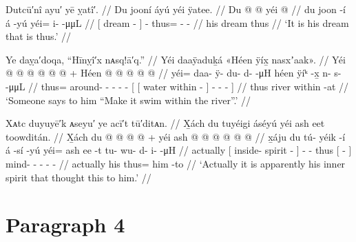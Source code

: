 \ex\label{ex:91-31-dream-thus}%
%
\begingl
	\glpreamble	Dutcū′nî ayu′ yē ỵatî′. //
	\glpreamble	Du jooní áyú yéi ÿatee. //
	\gla	{} Du  @ {} {}  @ {}
		yéi @  {} {} //
	\glb	{} du joon -í {} á -yú
		yéi= i-  -μμL //
	\glc	{}[  dream - {}]  -
		thus= -  - //
	\gld	{} his dream {} {}  {}
		thus  {} {} //
	\glft	‘It is his dream that is thus.’
		//
\endgl
\xe

\ex\label{ex:91-32-say-make-swim-in-river}%
%
\begingl
	\glpreamble	Ye daỵa′doqa, “Hīnỵî′x nᴀsq!ā′q.” //
	\glpreamble	Yéi daaÿaduḵá «\!Héen ÿíx̱ nasxʼaak\!». //
	\gla	Yéi @  @ {} @ {} @ {} @ {} @ {} +
		{} {} Héen  @ {} {}
			 @ {} @ {} @ {} @ {} {} //
	\glb	yéi= daa- ÿ- du- d-  -μH
		{} {} héen ÿíᵏ -x̱ {}
			n- {} s-  -μμL {} //
	\glc	thus= around- - - -  -
		{}[ {}[ water within - {}]
			- \· -  - {}] //
	\gld	thus  {} {} {} {} {}
		{} {} river within -at {}
			 {} {} {} {} {} {} //
	\glft	‘Someone says to him “Make it swim within the river”.’
		//
\endgl
\xe

\ex\label{ex:91-33-inner-spirit-thought-to-him}%
%
\begingl
	\glpreamble	Xᴀtc duyuyē′k ᴀseyu′ ye acī′t tū′ditᴀn. //
	\glpreamble	X̱ách du tuyéigi áséyú yéi ash eet toowditán. //
	\gla	X̱ách {} du  @ {} @ {} {}  @ {} @ {} +
		yéi {} ash  @ {} {}  @ {} @ {} @ {} @ {} @ {} //
	\glb	x̱áju {} du tú- yéik -í {} á -sí -yú
		yéi= {} ash ee -t {} tu- wu- d- i-  -μH //
	\glc	actually {}[  inside- spirit - {}]  - -
		thus {}[   - {}]
			mind- - - -  - //
	\gld	actually {} his  {} {} {}  {} {}
		thus= {} him {} -to {}  {} {} {} {} {} //
	\glft	‘Actually it is apparently his inner spirit that thought this to him.’
		//
\endgl
\xe


\section{Paragraph 4}\label{sec:91-para-4}

